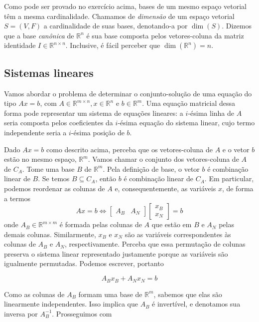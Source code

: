 \documentclass[]{article}
\numberwithin{equation}{section}
\begin{document}
Como pode ser provado no exercício acima, bases de um mesmo espaço vetorial têm a mesma cardinalidade. Chamamos de \emph{dimensão} de um espaço vetorial $S = (V, F)$ a cardinalidade de suas bases, denotando-a por $\dim(S)$. Dizemos que a base \emph{canônica} de $\mathbb{R}^n$ é sua base composta pelos vetores-coluna da matriz identidade $I \in \mathbb{R}^{n \times n}$. Inclusive, é fácil perceber que $\dim(\mathbb{R}^n) = n$.

\subsection{Sistemas lineares}

Vamos abordar o problema de determinar o conjunto-solução de uma equação do tipo $Ax = b$, com $A \in \mathbb{R}^{m \times n}, x \in \mathbb{R}^n$ e $b \in \mathbb{R}^m$. Uma equação matricial dessa forma pode representar um sistema de equações lineares: a $i$-ésima linha de $A$ seria composta pelos coeficientes da $i$-ésima equação do sistema linear, cujo termo independente seria a $i$-ésima posição de $b$.

Dado $Ax = b$ como descrito acima, perceba que os vetores-coluna de $A$ e o vetor $b$ estão no mesmo espaço, $\mathbb{R}^m$. Vamos chamar o conjunto dos vetores-coluna de $A$ de $C_A$. Tome uma base $B$ de $\mathbb{R}^m$. Pela definição de base, o vetor $b$ é combinação linear de $B$. Se temos $B \subseteq C_A$, então $b$ é combinação linear de $C_A$. Em particular, podemos reordenar as colunas de $A$ e, consequentemente, as variáveis $x$, de forma a termos
$$
Ax = b \iff
\begin{bmatrix}
A_B & A_N
\end{bmatrix}
\begin{bmatrix}
x_B \\
x_N
\end{bmatrix}
= b
$$
onde $A_B \in \mathbb{R}^{m \times m}$ é formada pelas colunas de $A$ que estão em $B$ e $A_N$ pelas demais colunas. Similarmente, $x_B$ e $x_N$ são as variáveis correspondentes às colunas de $A_B$ e $A_N$, respectivamente. Perceba que essa permutação de colunas preserva o sistema linear representado justamente porque as variáveis são igualmente permutadas. Podemos escrever, portanto

$$
A_B x_B + A_N x_N = b
$$

Como as colunas de $A_B$ formam uma base de $\mathbb{R}^m$, sabemos que elas são linearmente independentes. Isso implica que $A_B$ é invertível, e denotamos sua inversa por $A_B^{-1}$. Prosseguimos com
\end{document}
